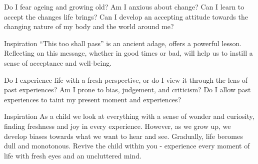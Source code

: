 \newpage
\begin{mananam}{}
\mananamtext Do I fear ageing and growing old? Am I anxious about change? Can I learn to accept the changes life brings? Can I develop an accepting attitude towards the changing nature of my body and the world around me?
\end{mananam}
\WritingHand{}
\begin{inspiration}{\mananamfont Inspiration}
\mananamtext “This too shall pass” is an ancient adage, offers a powerful lesson. Reflecting on this message, whether in good times or bad, will help us to instill a sense of acceptance and well-being.
\end{inspiration}
\newpage

\newpage
\begin{mananam}{}
\mananamtext Do I experience life with a fresh perspective, or do I view it through the lens of past experiences? Am I prone to bias, judgement, and criticism? Do I allow past experiences to taint my present moment and experiences?
\end{mananam}
\WritingHand{}
\begin{inspiration}{\mananamfont Inspiration}
\mananamtext As a child we look at everything with a sense of wonder and curiosity, finding freshness and joy in every experience. However, as we grow up, we develop biases towards what we want to hear and see. Gradually, life becomes dull and monotonous. Revive the child within you - experience every moment of life with fresh eyes and an uncluttered mind. 
\end{inspiration}
\newpage


